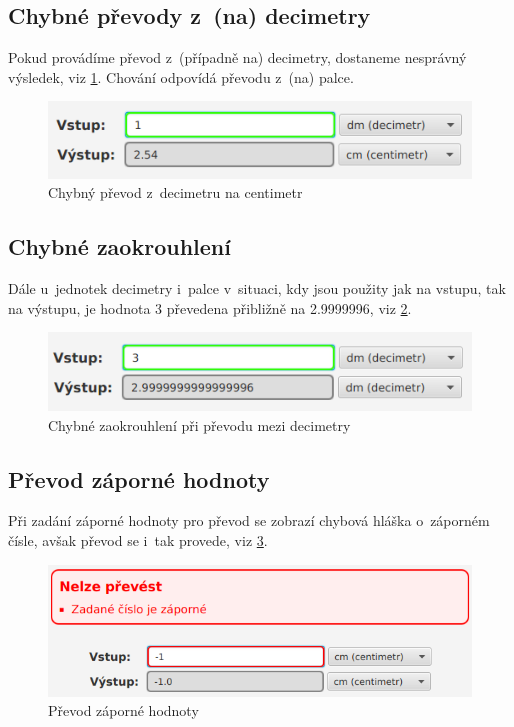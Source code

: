 		\subsection{Chybné převody z~(na) decimetry}
		Pokud provádíme převod z~(případně na) decimetry, dostaneme nesprávný výsledek, viz \ref{ChybaDm}. Chování odpovídá převodu z~(na) palce.
			\begin{figure}[ht!]
				\centering
				\caption{Chybný převod z~decimetru na centimetr}
				\label{ChybaDm}
				\includegraphics[width=13.5cm]{img/Chyby/Dm.png}
			\end{figure}
			\FloatBarrier
		
		\subsection{Chybné zaokrouhlení}
		Dále u~jednotek decimetry i~palce v~situaci, kdy jsou použity jak na vstupu, tak na výstupu, je hodnota 3 převedena přibližně na 2.9999996, viz \ref{Zaokrouhleni}.
			\begin{figure}[ht!]
				\centering
				\caption{Chybné zaokrouhlení při převodu mezi decimetry}
				\label{Zaokrouhleni}
				\includegraphics[width=13.5cm]{img/Chyby/Zaokrouhleni.png}
			\end{figure}
			\FloatBarrier
		
		\subsection{Převod záporné hodnoty}
		Při zadání záporné hodnoty pro převod se zobrazí chybová hláška o~záporném čísle, avšak převod se i~tak provede, viz \ref{ZapornaHodnota}.
			\begin{figure}[ht!]
				\centering
				\caption{Převod záporné hodnoty}
				\label{ZapornaHodnota}
				\includegraphics[width=13.5cm]{img/Chyby/ZapornaHodnota.png}
			\end{figure}
			\FloatBarrier
		
